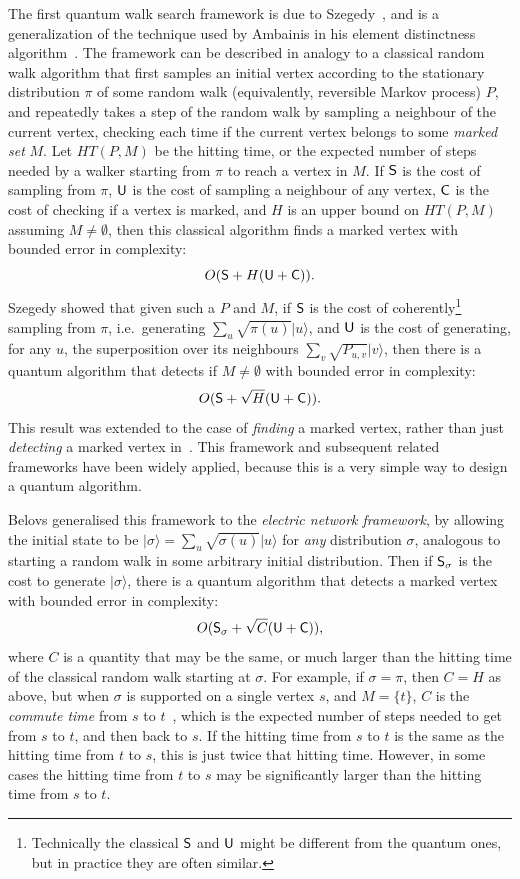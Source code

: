 \documentclass{article}
\def\ket#1{{\lvert}#1\rangle}
\renewcommand{\>}{\rangle}
\newcommand{\<}{\langle}
\renewcommand{\(}{\left(}
\renewcommand{\)}{\right)}
\begin{document}
The first quantum walk search framework is due to Szegedy~\cite{szegedy2004QMarkovChainSearch}, and is a generalization of the technique used by Ambainis in his element distinctness algorithm~\cite{ambainis2004QWalkForElementDist}. The framework can be described in analogy to a classical random walk algorithm that first samples an initial vertex according to the stationary distribution $\pi$ of some random walk (equivalently, reversible Markov process) $P$, and repeatedly takes a step of the random walk by sampling a neighbour of the current vertex, checking each time if the current vertex belongs to some \emph{marked set} $M$. Let $HT(P,M)$ be the hitting time, or the expected number of steps needed by a walker starting from $\pi$ to reach a vertex in $M$.
If ${\sf S}$ is the cost of sampling from $\pi$, ${\sf U}$ is the cost of sampling a neighbour of any vertex, ${\sf C}$ is the cost of checking if a vertex is marked, and $H$ is an upper bound on $HT(P,M)$ assuming $M\neq\emptyset$, then this classical algorithm finds a marked vertex with bounded error in complexity:
$$O({\sf S}+H({\sf U}+{\sf C})).$$
Szegedy showed that given such a $P$ and $M$, if ${\sf S}$ is the cost of coherently\footnote{Technically the classical ${\sf S}$ and ${\sf U}$ might be different from the quantum ones, but in practice they are often similar.} sampling from $\pi$, i.e.~generating $\sum_u\sqrt{\pi(u)}\ket{u}$, and ${\sf U}$ is the cost of generating, for any $u$, the superposition over its neighbours $\sum_v\sqrt{P_{u,v}}\ket{v}$, then there is a quantum algorithm that detects if $M\neq \emptyset$ with bounded error in complexity:
$$O({\sf S}+\sqrt{H}({\sf U}+{\sf C})).$$
This result was extended to the case of \emph{finding} a marked vertex, rather than just \emph{detecting} a marked vertex in~\cite{ambainis2019QuadSpeedupFindingMarkedQW}. This framework and subsequent related frameworks have been widely applied, because this is a very simple way to design a quantum algorithm. 

Belovs generalised this framework to the \emph{electric network framework}, by allowing the initial state to be $\ket{\sigma}=\sum_u\sqrt{\sigma(u)}\ket{u}$ for \emph{any} distribution $\sigma$, analogous to starting a random walk in some arbitrary initial distribution. Then if ${\sf S}_\sigma$ is the cost to generate $\ket{\sigma}$, there is a quantum algorithm that detects a marked vertex with bounded error in complexity:
$$O({\sf S}_\sigma+\sqrt{C}({\sf U}+{\sf C})),$$
where $C$ is a quantity that may be the same, or much larger than the hitting time of the classical random walk starting at $\sigma$. For example, if $\sigma=\pi$, then $C=H$ as above, but when $\sigma$ is supported on a single vertex $s$, and $M=\{t\}$, $C$ is the \emph{commute time} from $s$ to $t$~\cite{chandra1996ElectricalResAndCommute}, which is the expected number of steps needed to get from $s$ to $t$, and then back to $s$. If the hitting time from $s$ to $t$ is the same as the hitting time from $t$ to $s$, this is just twice that hitting time. However, in some cases the hitting time from $t$ to $s$ may be significantly larger than the hitting time from $s$ to $t$. 
\end{document}
